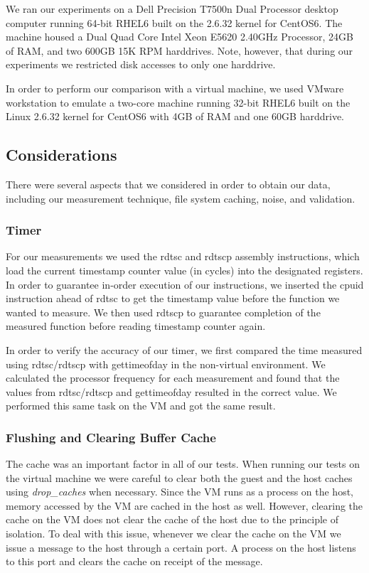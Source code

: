 We ran our experiments on a Dell Precision T7500n Dual Processor desktop 
computer running 64-bit RHEL6 built on the 2.6.32 kernel for CentOS6. The 
machine housed a Dual Quad Core Intel\textsuperscript{\textregistered} 
Xeon\textsuperscript{\textregistered} E5620 2.40GHz Processor, 24GB of RAM, 
and two 600GB 15K RPM harddrives. Note, however, that during our experiments 
we restricted disk accesses to only one harddrive.

In order to perform our comparison with a virtual machine, we used VMware 
workstation to emulate a two-core machine running 32-bit RHEL6 built on the 
Linux 2.6.32 kernel for CentOS6 with 4GB of RAM and one 60GB harddrive.

\subsection{Considerations}
There were several aspects that we considered in order to obtain our data, 
including our measurement technique, file system caching, noise, and validation.

\subsubsection{Timer}
For our measurements we used the rdtsc and rdtscp assembly instructions, which load 
the current timestamp counter value (in cycles) into the designated registers. In 
order to guarantee in-order execution of our instructions, we inserted the cpuid 
instruction ahead of rdtsc to get the timestamp value before the function we wanted 
to measure. We then used rdtscp to guarantee completion of the measured function 
before reading timestamp counter again.

In order to verify the accuracy of our timer, we first compared the time measured 
using rdtsc/rdtscp with gettimeofday in the non-virtual environment. We calculated
the processor frequency for each measurement and found that the values from 
rdtsc/rdtscp and gettimeofday resulted in the correct value. We performed this 
same task on the VM and got the same result. 

\subsubsection{Flushing and Clearing Buffer Cache}
The cache was an important factor in all of our tests. When running our tests on the
virtual machine we were careful to clear both the guest and the host caches using 
\emph{drop\_caches} when necessary. Since the VM runs as a process on the host, memory 
accessed by the VM are cached in the host as well. However, clearing the cache on the VM 
does not clear the cache of the host due to the principle of isolation. To deal with this
issue, whenever we clear the cache on the VM we issue a message to the host through
a certain port. A process on the host listens to this port and clears the cache on
receipt of the message.

